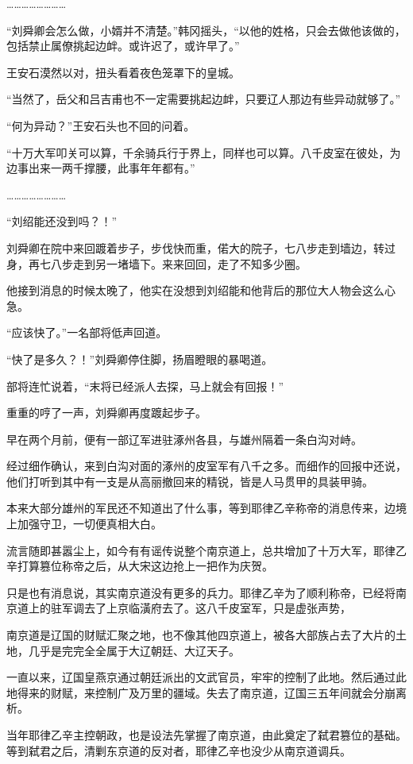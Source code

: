 ……………………

“刘舜卿会怎么做，小婿并不清楚。”韩冈摇头，“以他的姓格，只会去做他该做的，包括禁止属僚挑起边衅。或许迟了，或许早了。”

王安石漠然以对，扭头看着夜色笼罩下的皇城。

“当然了，岳父和吕吉甫也不一定需要挑起边衅，只要辽人那边有些异动就够了。”

“何为异动？”王安石头也不回的问着。

“十万大军叩关可以算，千余骑兵行于界上，同样也可以算。八千皮室在彼处，为边事出来一两千撑腰，此事年年都有。”

……………………

“刘绍能还没到吗？！”

刘舜卿在院中来回踱着步子，步伐快而重，偌大的院子，七八步走到墙边，转过身，再七八步走到另一堵墙下。来来回回，走了不知多少圈。

他接到消息的时候太晚了，他实在没想到刘绍能和他背后的那位大人物会这么心急。

“应该快了。”一名部将低声回道。

“快了是多久？！”刘舜卿停住脚，扬眉瞪眼的暴喝道。

部将连忙说着，“末将已经派人去探，马上就会有回报！”

重重的哼了一声，刘舜卿再度踱起步子。

早在两个月前，便有一部辽军进驻涿州各县，与雄州隔着一条白沟对峙。

经过细作确认，来到白沟对面的涿州的皮室军有八千之多。而细作的回报中还说，他们打听到其中有一支是从高丽撤回来的精锐，皆是人马贯甲的具装甲骑。

本来大部分雄州的军民还不知道出了什么事，等到耶律乙辛称帝的消息传来，边境上加强守卫，一切便真相大白。

流言随即甚嚣尘上，如今有有谣传说整个南京道上，总共增加了十万大军，耶律乙辛打算篡位称帝之后，从大宋这边抢上一把作为庆贺。

只是也有消息说，其实南京道没有更多的兵力。耶律乙辛为了顺利称帝，已经将南京道上的驻军调去了上京临潢府去了。这八千皮室军，只是虚张声势，

南京道是辽国的财赋汇聚之地，也不像其他四京道上，被各大部族占去了大片的土地，几乎是完完全全属于大辽朝廷、大辽天子。

一直以来，辽国皇燕京通过朝廷派出的文武官员，牢牢的控制了此地。然后通过此地得来的财赋，来控制广及万里的疆域。失去了南京道，辽国三五年间就会分崩离析。

当年耶律乙辛主控朝政，也是设法先掌握了南京道，由此奠定了弑君篡位的基础。等到弑君之后，清剿东京道的反对者，耶律乙辛也没少从南京道调兵。

